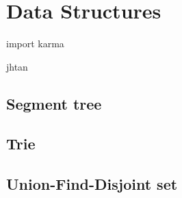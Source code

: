 \chapter{Data Structures}
	\epigraph{import karma}{jhtan}
	\section{Segment tree}
		
                
	\section{Trie}
		
	\section{Union-Find-Disjoint set}
		

